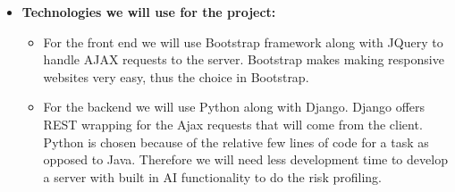 \documentclass{article}
\begin{document}
\begin{itemize}
		\item \textbf{Technologies we will use for the project:}
		\begin{itemize}
			\item For the front end we will use Bootstrap framework along with JQuery to handle AJAX requests to the server. Bootstrap makes making responsive websites very easy, thus the choice in Bootstrap.
			\item For the backend we will use Python along with Django. Django offers REST wrapping for the Ajax requests that will come from the client. Python is chosen because of the relative few lines of code for a task as opposed to Java. Therefore we will need less development time to develop a server with built in AI functionality to do the risk profiling.			
		\end{itemize}
	\end{itemize}
\end{document}

